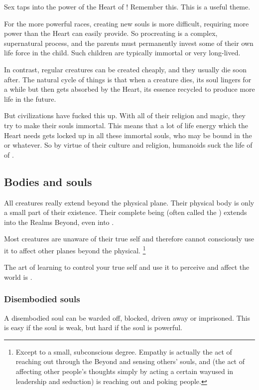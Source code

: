 Sex taps into the power of the Heart of \Miith{}! Remember this. This is a useful theme. 

For the more powerful races, creating new souls is more difficult, requiring more power than the Heart can easily provide. So procreating is a complex, supernatural process, and the parents must permanently invest some of their own life force in the child. Such children are typically immortal or very long-lived. 

In contrast, regular creatures can be created cheaply, and they usually die soon after. The natural cycle of things is that when a creature dies, its soul lingers for a while but then gets absorbed by the Heart, its essence recycled to produce more life in the future. 

But civilizations have fucked this up. With all of their religion and magic, they try to make their souls immortal. This means that a lot of life energy which the Heart needs gets locked up in all these immortal souls, who may be bound in the \Sephiroth{} or whatever. So by virtue of their culture and religion, humanoids suck the life of of \Miith{}. 









\subsection{Bodies and souls}
All creatures really extend beyond the physical plane. 
Their physical body is only a small part of their existence. 
Their complete being (often called the ) extends into the Realms Beyond, even into . 


Most creatures are unaware of their true self and therefore cannot consciously use it to affect other planes beyond the physical.%
\footnote{%
  Except to a small, subconscious degree. 
  Empathy is actually the act of reaching out through the Beyond and sensing others' souls, and  (the act of affecting other people's thoughts simply by acting a certain way\dash used in leadership and seduction) is reaching out and poking people.} 

The art of learning to control your true self and use it to perceive and affect the world is \emph{}. 





\subsubsection{Disembodied souls}
A disembodied soul can be warded off, blocked, driven away or imprisoned. 
This is easy if the soul is weak, but hard if the soul is powerful. 

